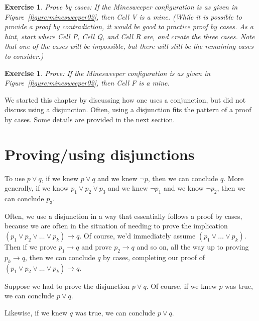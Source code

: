 \documentclass{book}
\newcounter{ekcounter}%
\theoremstyle{ekimcustom}
\newtheorem{exercise}[ekcounter]{Exercise}
\begin{document}
\begin{exercise}
Prove by cases: If the Minesweeper configuration is as given in Figure~\ref{figure:minesweeper02}, then Cell V is a mine. (While it is possible to provide a proof by contradiction, it would  be good to practice proof by cases. As a hint, start where Cell P, Cell Q, and Cell R are, and create the three cases. Note that one of the cases will be impossible, but there will still be the remaining cases to consider.)
\end{exercise}

\begin{exercise}
Prove: If the Minesweeper configuration is as given in Figure~\ref{figure:minesweeper02}, then Cell F is a mine.
\end{exercise}

We started this chapter by discussing how one uses a conjunction, but did not discuss using a disjunction. Often, using a disjunction fits the pattern of a proof by cases. Some details are provided in the next section.


\section{Proving/using disjunctions}

To use $p \vee q$, if we knew $p \vee q$ and we knew $\neg p$, then we can conclude $q$. More generally, if we know $p_1 \vee p_2 \vee p_3$ and we knew $\neg p_1$ and we know $\neg p_2$, then we can conclude $p_3$.

Often, we use a disjunction in a way that essentially follows a proof by cases, because we are often in the situation of needing to prove the implication $(p_1 \vee p_2 \vee \dots \vee p_k) \rightarrow q$. Of course, we'd immediately assume $(p_1 \vee \dots \vee p_k)$. Then if we prove $p_1 \rightarrow q$ and prove $p_2 \rightarrow q$ and so on, all the way up to proving $p_k \rightarrow q$, then we can conclude $q$ by cases, completing our proof of $(p_1 \vee p_2 \vee \dots \vee p_k) \rightarrow q$.

Suppose we had to prove the disjunction $p \vee q$. Of course, if we knew $p$ was true, we can conclude $p \vee q$.
\begin{center}
\end{center}
Likewise, if we knew $q$ was true, we can conclude $p \vee q$.
\end{document}
